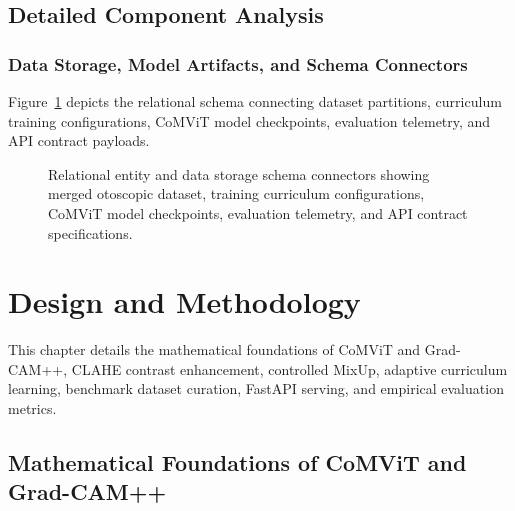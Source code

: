 \documentclass[12pt,a4paper]{report}
\begin{document}
\section{Detailed Component Analysis}

\subsection{Data Storage, Model Artifacts, and Schema Connectors}
Figure~\ref{fig:db_schema} depicts the relational schema connecting dataset partitions, curriculum training configurations, CoMViT model checkpoints, evaluation telemetry, and API contract payloads.

\begin{figure}[H]
    \centering
    \caption{Relational entity and data storage schema connectors showing merged otoscopic dataset, training curriculum configurations, CoMViT model checkpoints, evaluation telemetry, and API contract specifications.}
    \label{fig:db_schema}
\end{figure}

\chapter{Design and Methodology}

This chapter details the mathematical foundations of CoMViT and Grad-CAM++, CLAHE contrast enhancement, controlled MixUp, adaptive curriculum learning, benchmark dataset curation, FastAPI serving, and empirical evaluation metrics.

\section{Mathematical Foundations of CoMViT and Grad-CAM++}
\end{document}
